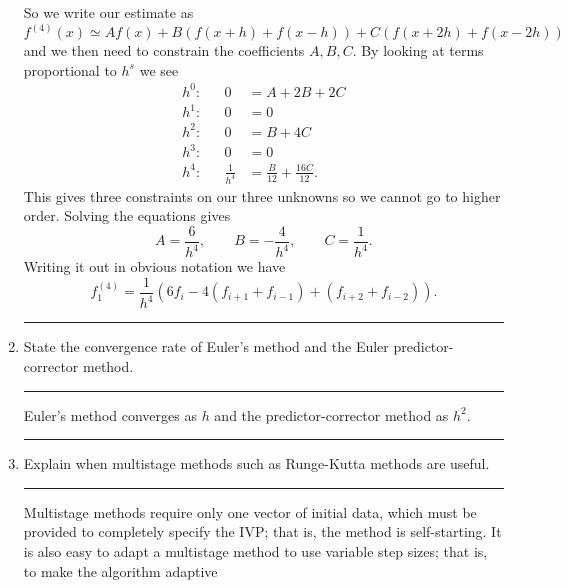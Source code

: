 \documentclass[10pt]{article}
\begin{document}
\begin{enumerate}
  So we write our estimate as
  \begin{equation*}
    f^{(4)}(x) \simeq A f(x) + B \left( f(x + h) + f(x - h) \right)
    + C \left( f(x + 2 h) +  f(x - 2 h) \right)
  \end{equation*}
  and we then need to constrain the coefficients $A, B, C$. By looking
  at terms proportional to $h^s$ we see
  \begin{align*}
    h^0: && 0 & = A + 2 B + 2 C \\
    h^1: && 0 & = 0 \\
    h^2: && 0 & = B + 4 C \\
    h^3: && 0 & = 0 \\
    h^4: && \frac{1}{h^4} & = \frac{B}{12} + \frac{16 C}{12}. 
  \end{align*}
  This gives three constraints on our three unknowns so we cannot go
  to higher order. Solving the equations gives
  \begin{equation*}
    A = \frac{6}{h^4}, \qquad B = -\frac{4}{h^4}, \qquad C =
    \frac{1}{h^4}.
  \end{equation*}
  Writing it out in obvious notation we have
  \begin{equation*}
    f_1^{(4)} = \frac{1}{h^4} \left( 6 f_i - 4 (f_{i+1} + f_{i-1}) +
      (f_{i+2} + f_{i-2}) \right).
  \end{equation*}
  \begin{center}
    \rule{0.9\textwidth}{.1pt}
  \end{center}
\item State the convergence rate of Euler's method and the
  Euler predictor-corrector method.
  \begin{center}
    \rule{0.9\textwidth}{.1pt}
  \end{center}
  Euler's method converges as $h$ and the predictor-corrector method
  as $h^2$.
  \begin{center}
    \rule{0.9\textwidth}{.1pt}
  \end{center}
\item Explain when multistage methods such as Runge-Kutta methods are useful.
  \begin{center}
    \rule{0.9\textwidth}{.1pt}
  \end{center}
  Multistage methods require only one vector of initial data, which
  must be provided to completely specify the IVP; that is, the method
  is self-starting. It is also easy to adapt a multistage method to
  use variable step sizes; that is, to make the algorithm adaptive

\end{enumerate}
\end{document}

